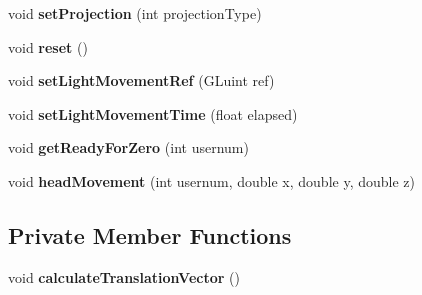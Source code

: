 \begin{DoxyCompactItemize}
\item 
\hypertarget{class_spelchk_camera_a95b87c80007941d85d26c43d30fa7f87}{void {\bfseries set\-Projection} (int projection\-Type)}\label{class_spelchk_camera_a95b87c80007941d85d26c43d30fa7f87}

\item 
\hypertarget{class_spelchk_camera_a29d4ba987d9f3e1c47e1103fcea0ae2b}{void {\bfseries reset} ()}\label{class_spelchk_camera_a29d4ba987d9f3e1c47e1103fcea0ae2b}

\item 
\hypertarget{class_spelchk_camera_a20436fee96b0d6a1279d10b88e20f520}{void {\bfseries set\-Light\-Movement\-Ref} (G\-Luint ref)}\label{class_spelchk_camera_a20436fee96b0d6a1279d10b88e20f520}

\item 
\hypertarget{class_spelchk_camera_aed5d76d2de23473dec034161efe29275}{void {\bfseries set\-Light\-Movement\-Time} (float elapsed)}\label{class_spelchk_camera_aed5d76d2de23473dec034161efe29275}

\item 
\hypertarget{class_spelchk_camera_a90aa5e06ba61d44e63535acf2cc3e373}{void {\bfseries get\-Ready\-For\-Zero} (int usernum)}\label{class_spelchk_camera_a90aa5e06ba61d44e63535acf2cc3e373}

\item 
\hypertarget{class_spelchk_camera_afc39db6b4eab85070aa5d7494d0c5198}{void {\bfseries head\-Movement} (int usernum, double x, double y, double z)}\label{class_spelchk_camera_afc39db6b4eab85070aa5d7494d0c5198}

\end{DoxyCompactItemize}
\subsection*{Private Member Functions}
\begin{DoxyCompactItemize}
\item 
\hypertarget{class_spelchk_camera_a539230ff6d91932526666d4eee9d6c0d}{void {\bfseries calculate\-Translation\-Vector} ()}\label{class_spelchk_camera_a539230ff6d91932526666d4eee9d6c0d}

\end{DoxyCompactItemize}
